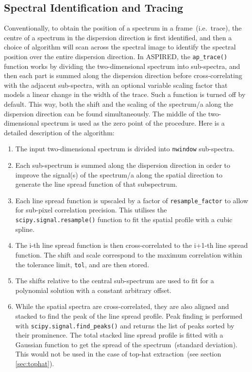 \documentclass[twocolumn, linenumbers]{aastex631}
\begin{document}
\subsection{Spectral Identification and Tracing}
\label{sec:tracing}
Conventionally, to obtain the position of a spectrum in a frame~(i.e.\ trace),
the centre of a spectrum in the dispersion direction is first identified,
and then a choice of algorithm will scan across the spectral image to identify
the spectral position over the entire dispersion direction. In \textsc{ASPIRED},
the \texttt{ap\_trace()} function works by dividing the two-dimensional spectrum
into sub-spectra, and then each part is summed along the dispersion direction
before cross-correlating with the adjacent sub-spectra, with an optional variable
scaling factor that models a linear change in the width of the trace. Such a
function is turned off by default. This way, both the shift and the scaling of
the spectrum/a along the dispersion direction can be found simultaneously. The
middle of the two-dimensional spectrum is used as the zero point of the procedure. Here is
a detailed description of the algorithm:
\begin{enumerate}
    \item
        The input two-dimensional spectrum is divided into \texttt{nwindow}
        sub-spectra.
    \item
        Each sub-spectrum is summed along the dispersion direction
        in order to improve the signal(s) of the spectrum/a along
        the spatial direction to generate the line spread function
        of that subspectrum.
    \item
        Each line spread function is upscaled by a factor of
        \texttt{resample\_factor} to allow for sub-pixel correlation
        precision. This utilises the \texttt{scipy.signal.resample()}
        function to fit the spatial profile with a cubic spline.
    \item
        The i-th line spread function is then cross-correlated to the i+1-th
        line spread function. The shift and scale correspond to the maximum
        correlation within the tolerance limit, \texttt{tol}, and are then stored.
    \item
        The shifts relative to the central sub-spectrum are used to
        fit for a polynomial solution with a constant arbitrary offset.
    \item
        While the spatial spectra are cross-correlated, they are also
        aligned and stacked to find the peak of the line spread profile.
        Peak finding is performed with \texttt{scipy.signal.find\_peaks()}
        and returns the list of peaks sorted by their prominence. The
        total stacked line spread profile is fitted with a Gaussian
        function to get the spread of the spectrum~(standard deviation).
        This would not be used in the case of top-hat
        extraction~(see section \textsection\ref{sec:tophat}).
\end{enumerate}
\end{document}

